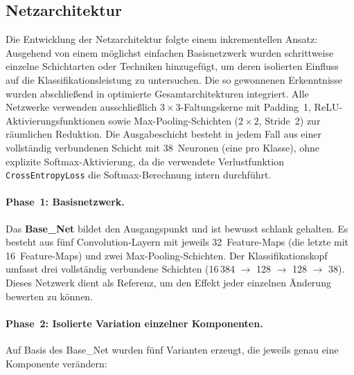 \subsection{Netzarchitektur}
\label{subsec:architektur}
 
Die Entwicklung der Netzarchitektur folgte einem inkrementellen Ansatz: Ausgehend von einem möglichst einfachen Basisnetzwerk wurden schrittweise einzelne Schichtarten oder Techniken hinzugefügt, um deren isolierten Einfluss auf die Klassifikationsleistung zu untersuchen.
Die so gewonnenen Erkenntnisse wurden abschließend in optimierte Gesamtarchitekturen integriert.
Alle Netzwerke verwenden ausschließlich $3 \times 3$-Faltungskerne mit Padding~1, ReLU-Aktivierungsfunktionen sowie Max-Pooling-Schichten ($2 \times 2$, Stride~2) zur räumlichen Reduktion.
Die Ausgabeschicht besteht in jedem Fall aus einer vollständig verbundenen Schicht mit 38~Neuronen (eine pro Klasse), ohne explizite Softmax-Aktivierung, da die verwendete Verlustfunktion \texttt{CrossEntropyLoss} die Softmax-Berechnung intern durchführt.
 
\paragraph{Phase~1: Basisnetzwerk.}
Das \textbf{Base\_Net} bildet den Ausgangspunkt und ist bewusst schlank gehalten.
Es besteht aus fünf Convolution-Layern mit jeweils 32~Feature-Maps (die letzte mit 16~Feature-Maps) und zwei Max-Pooling-Schichten.
Der Klassifikationskopf umfasst drei vollständig verbundene Schichten (16\,384 $\rightarrow$ 128 $\rightarrow$ 128 $\rightarrow$ 38).
Dieses Netzwerk dient als Referenz, um den Effekt jeder einzelnen Änderung bewerten zu können.
 
\paragraph{Phase~2: Isolierte Variation einzelner Komponenten.}
Auf Basis des Base\_Net wurden fünf Varianten erzeugt, die jeweils genau eine Komponente verändern:
 
